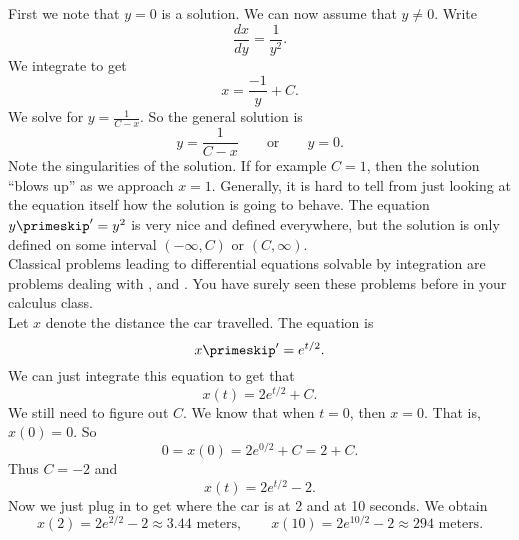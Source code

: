 {
First we note that $y=0$ is a solution.  We can now assume that $y \not= 0$.
Write
\begin{equation*}
\frac{dx}{dy} = \frac{1}{y^2} .
\end{equation*}
We integrate to get
\begin{equation*}
x = \frac{-1}{y} + C .
\end{equation*}
We solve for $y = \frac{1}{C-x}$.
So the general solution is
\begin{equation*}
y = \frac{1}{C-x} \qquad \text{or} \qquad y = 0.
\end{equation*}
Note the singularities of the solution.  If for example $C=1$, then the
solution ``blows up'' as we approach $x=1$.  Generally,
it is hard to tell
from just looking at the equation itself how the solution is going to behave.
The equation $y\primeskip ' = y^2$ is very nice and defined everywhere, but
the solution is only defined on some interval $(-\infty, C)$ or
$(C, \infty)$.
}\\

Classical problems leading to differential equations solvable by integration
are problems 
dealing with ,
 and .  You have surely seen these
problems before in your calculus class.\\

{
Let $x$ denote the distance the car travelled.
The equation is
\begin{equation*}
x\primeskip' = e^{t/2} .
\end{equation*}
We can just integrate this equation to get that
\begin{equation*}
x(t) = 2 e^{t/2} + C . 
\end{equation*}
We still need to figure out $C$.  We know that when $t=0$, then
$x=0$.  That is, $x(0) = 0$.  So
\begin{equation*}
0 = x(0) = 2e^{0/2} + C = 2 + C .
\end{equation*}
Thus $C = -2$ and 
\begin{equation*}
x(t) = 2 e^{t/2} - 2 .
\end{equation*}
Now we just plug in to get where the car is at 2 and at 10 seconds.
We obtain
\begin{equation*}
x(2) = 2e^{2/2} - 2 \approx 3.44 \text{ meters} ,
\qquad
x(10) = 2e^{10/2} - 2 \approx 294 \text{ meters} .
\end{equation*}
}\\

